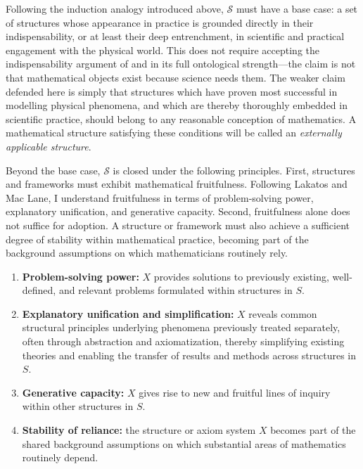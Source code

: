 \documentclass[11pt,a4paper]{article}
\begin{document}
Following the induction analogy introduced above, $\mathcal{S}$ must have a base case: a set of structures whose appearance in practice is grounded directly in their indispensability, or at least their deep entrenchment, in scientific and practical engagement with the physical world. This does not require accepting the indispensability argument of \textcite{quine1960} and \textcite{putnam1971} in its full ontological strength---the claim is not that mathematical objects exist because science needs them. The weaker claim defended here is simply that structures which have proven most successful in modelling physical phenomena, and which are thereby thoroughly embedded in scientific practice, should belong to any reasonable conception of mathematics. A mathematical structure satisfying these conditions will be called an \textit{externally applicable structure}.

Beyond the base case, $\mathcal{S}$ is closed under the following principles. First, structures and frameworks must exhibit mathematical fruitfulness. Following Lakatos and Mac Lane, I understand fruitfulness in terms of problem-solving power, explanatory unification, and generative capacity. Second, fruitfulness alone does not suffice for adoption. A structure or framework must also achieve a sufficient degree of stability within mathematical practice, becoming part of the background assumptions on which mathematicians routinely rely.

\begin{enumerate}

    \item \label{condition1} \textbf{Problem-solving power:} $X$ provides solutions to previously existing, well-defined, and relevant problems formulated within structures in $S$.

    \item \label{condition2} \textbf{Explanatory unification and simplification:} $X$ reveals common structural principles underlying phenomena previously treated separately, often through abstraction and axiomatization, thereby simplifying existing theories and enabling the transfer of results and methods across structures in $S$.

    \item \label{condition3} \textbf{Generative capacity:} $X$ gives rise to new and fruitful lines of inquiry within other structures in $S$.
    
    \item \label{condition4} \textbf{Stability of reliance:} the structure or axiom system $X$ becomes part of the shared background assumptions on which substantial areas of mathematics routinely depend.
    
\end{enumerate}
\end{document}
